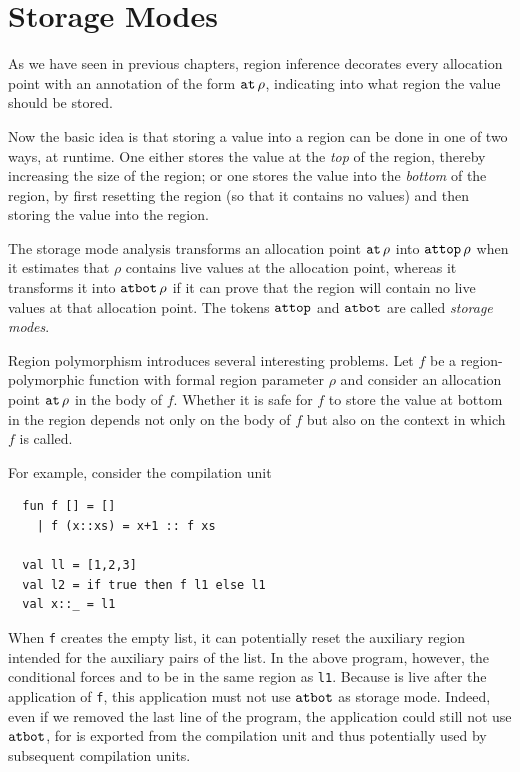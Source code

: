 \documentclass[12pt]{book}
\begin{document}
\section{Storage Modes}
As we have seen in previous chapters, region inference decorates every
%
%
allocation point with an annotation of the form $\mathbin{\hbox{\tt at}}\,\rho$,
indicating into what region the value should be stored.

Now the basic idea is that storing a value into a region can be done
in one of two ways, at runtime. One either stores the value at the
%
{\em top\/} of the region, thereby increasing the size of the region;
or one stores the value into the
%
{\em bottom\/} of the region, by first resetting the region (so that
it contains no values) and then storing the value into the region.

The storage mode analysis transforms an allocation point $\mathbin{\hbox{\tt at}}\,\rho$
into
%
$\hbox{\tt attop}\,\rho$ when it estimates that $\rho$ contains live values at
the allocation point, whereas it transforms it into
%
$\hbox{\tt atbot}\,\rho$ if it can prove that the region will contain no live
values at that allocation point. The tokens $\hbox{\tt attop}$ and $\hbox{\tt atbot}$ are
called
%
{\em storage modes}.

%
Region polymorphism introduces several interesting problems. Let $f$
be a region-polymorphic function with formal region parameter $\rho$
and consider an allocation point $\mathbin{\hbox{\tt at}}\,\rho$ in the body of $f$.
Whether it is safe for $f$ to store the value at bottom in the region
depends not only on the body of $f$ but also on the context in which
$f$ is called.

For example, consider the compilation unit
\begin{verbatim}
  fun f [] = []
    | f (x::xs) = x+1 :: f xs

  val ll = [1,2,3]
  val l2 = if true then f l1 else l1
  val x::_ = l1
\end{verbatim}
When {\tt f} creates the empty list, it can potentially reset the
%
auxiliary region intended for the
%
auxiliary pairs of the list. In the above program, however, the
conditional forces  and  to be in the same
region as {\tt l1}.  Because  is live after the application
of {\tt f}, this application must not use $\hbox{\tt atbot}$ as storage mode.
Indeed, even if we removed the last line of the program, the
application could still not use $\hbox{\tt atbot}$, for  is exported
from the compilation unit and thus potentially used by subsequent
compilation units.
\end{document}
